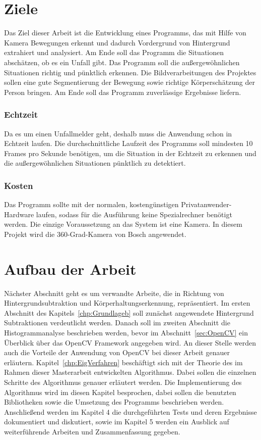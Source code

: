 \section{Ziele}\label{chp:Ziele}   
Das Ziel dieser Arbeit ist die Entwicklung eines Programms, das mit Hilfe von Kamera Bewegungen erkennt und dadurch Vordergrund von Hintergrund extrahiert und analysiert. Am Ende soll das Programm die Situationen abschätzen, ob es ein Unfall gibt. Das Programm soll die außergewöhnlichen Situationen richtig und pünktlich erkennen. Die Bildverarbeitungen des Projektes sollen eine gute Segmentierung der Bewegung sowie richtige Körperschätzung der Person bringen. Am Ende soll das Programm zuverlässige Ergebnisse liefern.      
\subsubsection{Echtzeit} 
Da es um einen Unfallmelder geht, deshalb muss die Anwendung schon in Echtzeit laufen. Die durchschnittliche Laufzeit des Programms soll mindesten 10 Frames pro Sekunde benötigen, um die Situation in der Echtzeit zu erkennen und die außergewöhnlichen Situationen pünktlich zu detektiert.  

\subsubsection{Kosten} 
Das Programm sollte mit der normalen, kostengünstigen Privatanwender-Hardware laufen, sodass für die Ausführung keine Spezialrechner benötigt werden. Die einzige Voraussetzung an das System ist eine Kamera. In diesem Projekt wird die 360-Grad-Kamera von Bosch angewendet.  

\section{Aufbau der Arbeit}
Nächster Abschnitt geht es um verwandte Arbeite, die in Richtung von Hintergrundsubtraktion und Körperhaltungserkennung, repräsentiert.
Im ersten Abschnitt des Kapitels~\ref{chp:Grundlageb} soll zunächst angewendete Hintergrund Subtraktionen verdeutlicht werden. Danach soll im zweiten Abschnitt die Histogrammanalyse beschrieben werden, bevor im Abschnitt~\ref{sec:OpenCV} ein Überblick über das OpenCV Framework angegeben wird. An dieser Stelle werden auch die Vorteile der Anwendung von OpenCV bei dieser Arbeit genauer erläutern. Kapitel~\ref{chp:EigVerfahren} beschäftigt sich mit der Theorie des im Rahmen dieser Masterarbeit entwickelten Algorithmus. Dabei sollen die einzelnen Schritte des Algorithmus genauer erläutert werden. Die Implementierung des Algorithmus wird im diesen Kapitel besprochen, dabei sollen die benutzten Bibliotheken sowie die Umsetzung des Programms beschrieben werden. Anschließend werden im Kapitel 4 die durchgeführten Tests und deren Ergebnisse dokumentiert und diskutiert, sowie im Kapitel 5 werden ein Ausblick auf weiterführende Arbeiten und Zusammenfassung gegeben.
